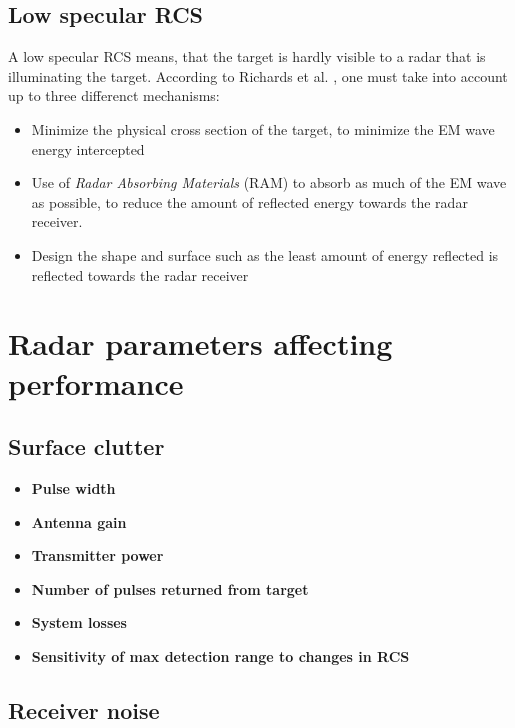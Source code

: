 \subsection{Low specular RCS}
A low specular RCS means, that the target is hardly visible to a radar that is illuminating the target. According to Richards et al. \citep{richards2010principles}, one must take into account up to three differenct mechanisms:
\begin{itemize}
	\item Minimize the physical cross section of the target, to minimize the EM wave energy intercepted
	\item Use of \textit{Radar Absorbing Materials} (RAM) to absorb as much of the EM wave as possible, to reduce the amount of reflected energy towards the radar receiver.
	\item Design the shape and surface such as the least amount of energy reflected is reflected towards the radar receiver
\end{itemize}


\section{Radar parameters affecting performance}

\subsection{Surface clutter}


\begin{itemize}
	\item \textbf{Pulse width}\newline
		
	\item \textbf{Antenna gain} \newline
	\item \textbf{Transmitter power}\newline
	\item \textbf{Number of pulses returned from target}\newline
	\item \textbf{System losses}\newline
	\item \textbf{Sensitivity of max detection range to changes in RCS}
\end{itemize}


\subsection{Receiver noise}

